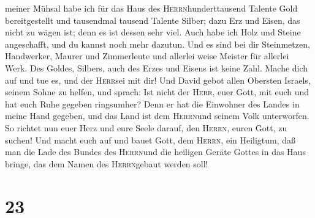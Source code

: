 meiner Mühsal habe ich für das Haus des \textsc{Herrn}hunderttausend
Talente Gold bereitgestellt und tausendmal tausend Talente Silber; dazu
Erz und Eisen, das nicht zu wägen ist; denn es ist dessen sehr viel.
Auch habe ich Holz und Steine angeschafft, und du kannst noch mehr
dazutun.  Und es sind bei dir Steinmetzen, Handwerker,
Maurer und Zimmerleute und allerlei weise Meister für allerlei Werk.
 Des Goldes, Silbers, auch des Erzes und Eisens ist keine
Zahl. Mache dich auf und tue es, und der \textsc{Herr}sei mit dir!
 Und David gebot allen Obersten Israels, seinem Sohne zu
helfen, und sprach:  Ist nicht der \textsc{Herr}, euer
Gott, mit euch und hat euch Ruhe gegeben ringsumher? Denn er hat die
Einwohner des Landes in meine Hand gegeben, und das Land ist dem
\textsc{Herrn}und seinem Volk unterworfen.  So richtet
nun euer Herz und eure Seele darauf, den \textsc{Herrn}, euren Gott, zu
suchen! Und macht euch auf und bauet Gott, dem \textsc{Herrn}, ein
Heiligtum, daß man die Lade des Bundes des \textsc{Herrn}und die
heiligen Geräte Gottes in das Haus bringe, das dem Namen des
\textsc{Herrn}gebaut werden soll!

\hypertarget{section-22}{%
\section{23}\label{section-22}}

